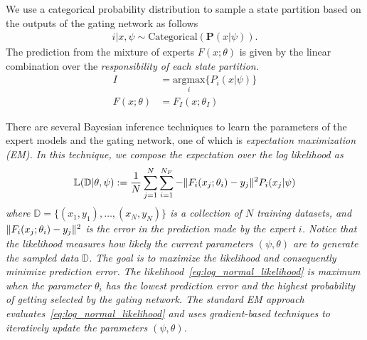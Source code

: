 We use a categorical probability distribution to sample a state partition based
on the outputs of the gating network as follows~\cite{harkonen2022mixtures} 
\begin{align}
  i | x, \psi \sim \text{Categorical}(\mathbf{P}(x| \psi)). 
  \label{eq:gating_categorical}
\end{align}
%
The prediction from the mixture of experts $F(x; \theta)$ is given by the linear
combination over the \it{responsibility} \normalfont of each state partition.
%
\begin{align*}
  I &= \underset{i}{\textrm{argmax}} \{ P_i(x | \psi) \}\\
  F(x; \theta) &= F_I(x; \theta_I)
\end{align*}



There are several Bayesian inference techniques to learn the parameters of the
expert models and the gating network, one of which is \it{expectation
maximization} \normalfont (EM).
%
In this technique, we compose the expectation over the log likelihood
as~\cite{bishop2006pattern}   
\begin{equation}
  \mathbb{L}(\mathbb{D} | \theta, \psi) := \frac{1}{N} \sum_{j=1}^{N} \sum_{i=1}^{N_F} -\|{F_i(x_j; \theta_i) - y_j}\|_{{}_{}}^2 P_i(x_j | \psi) 
  \label{eq:log_normal_likelihood}
\end{equation}
\noindent where $\mathbb{D} = \{(x_1, y_1), \dots, (x_N, y_N)\}$ is a collection
of $N$ training datasets, and $\|{F_i(x_j; \theta_i) - y_j}\|_{{}_{}}^2$ is the error in the
prediction made by the expert $i$.
%
Notice that the likelihood measures how likely the current parameters $(\psi,
\theta)$ are to generate the sampled data $\mathbb{D}$. 
%
The goal is to maximize the likelihood and consequently minimize prediction
error.
%
The likelihood~\eqref{eq:log_normal_likelihood} is maximum when the parameter $\theta_i$
has the lowest prediction error and the highest probability of getting selected
by the gating network.
%
The standard EM approach evaluates~\eqref{eq:log_normal_likelihood} and uses
gradient-based techniques to iteratively update the parameters $(\psi, \theta)$.
%